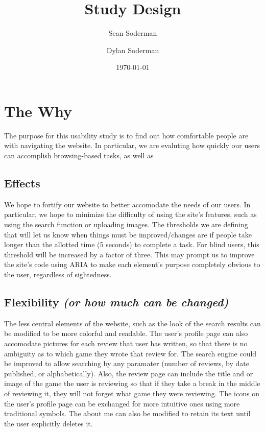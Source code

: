 \documentclass[11pt]{extarticle}
\begin{document}
\title{Study Design}
\author{Sean Soderman\\ 
        \and
        Dylan Soderman
}
\date{\today}
\maketitle

\section*{The Why} %
The purpose for this usability study is to find out how comfortable people are with navigating the website. In 
particular, we are evaluting how quickly our users can accomplish browsing-based tasks, as well as 
\subsection*{Effects}
We hope to fortify our website to better accomodate the needs of our users. In particular, we hope to minimize the
difficulty of using the site's features, such as using the search function or uploading images. The thresholds
we are defining that will let us know when things must be improved/changes are if people take longer than the
allotted time (5 seconds) to complete a task. For blind users, this threshold will be increased by a factor of
three. This may prompt us to improve the site's code using ARIA to make each element's
purpose completely obvious to the user, regardless of sightedness.
\subsection*{Flexibility \textit{(or how much can be changed)}}
The less central elements of the website, such as the look of the search results can be modified to be more colorful
and readable. The user's profile page can also accomodate pictures for each review that user has written, so that
there is no ambiguity as to which game they wrote that review for. The search engine could be improved to allow
searching by any paramater (number of reviews, by date published, or alphabetically). Also, the review page can
include the title and or image of the game the user is reviewing so that if they take a break in the middle of
reviewing it, they will not forget what game they were reviewing. The icons on the user's profile page can
be exchanged for more intuitive ones using more traditional symbols. The about me can also be modified to
retain its text until the user explicitly deletes it.
\end{document}
